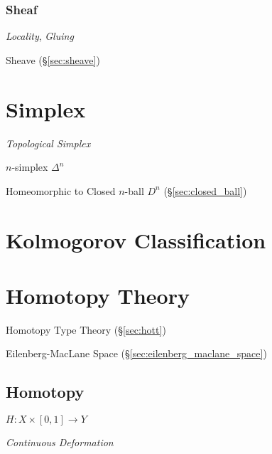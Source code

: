 \subsubsection{Sheaf}\label{sec:sheaf}

\emph{Locality}, \emph{Gluing}

Sheave (\S\ref{sec:sheave})



\section{Simplex}\label{sec:simplex}

\emph{Topological Simplex}

$n$-simplex $\Delta^n$

Homeomorphic to Closed $n$-ball $D^n$ (\S\ref{sec:closed_ball})



\section{Kolmogorov Classification}\label{sec:kolmogorov_classification}

\section{Homotopy Theory}\label{sec:homotopy_theory}

Homotopy Type Theory (\S\ref{sec:hott})

Eilenberg-MacLane Space (\S\ref{sec:eilenberg_maclane_space})



\subsection{Homotopy}\label{sec:homotopy}

$H : X \times [0,1] \rightarrow Y$

\emph{Continuous Deformation}




